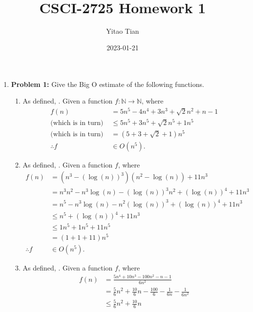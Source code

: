 \documentclass[12pt, a4paper]{article}
\begin{document}
\author{Yitao Tian}
\date{2023-01-21}
\title{CSCI-2725 Homework 1}
\maketitle

\begin{enumerate}
	\item \textbf{Problem 1:} Give the Big O estimate of the following functions. \label{1}
		\begin{enumerate}
		
			\item As defined, . Given a function $f: \mathbb{N} \rightarrow \mathbb{N}$, where
			\begin{align*}
				f(n)                     & = 5n^5 - 4n^4 + 3n^3 + \sqrt{2}n^2 + n - 1 \\
					\textrm{(which is in turn) } & \leq 5n^5 + 3n^5 + \sqrt{2}n^5 + 1n^5 \\
					\textrm{(which is in turn) } & = (5 + 3 + \sqrt{2} + 1) n^5 \\
				\therefore f             & \in O(n^{5}).
			\end{align*} \label{1(a)}
			\item As defined, . Given a function $f$, where
			\begin{align*}
				f(n)         & = (n^3 - (\log(n))^3)(n^2 - \log(n)) + 11n^3 \\
					         & = n^3n^2 - n^3\log(n) - (\log(n))^3n^2 + (\log(n))^4 + 11n^3 \\
					         & = n^5 - n^3\log(n) - n^2(\log(n))^3 + (\log(n))^4 + 11n^3 \\
					         & \leq n^5 + (\log(n))^4 + 11n^3 \\
					         & \leq 1n^5 + 1n^5 + 11n^5 \\
					         & = (1 + 1 + 11) n^5 \\
				\therefore f & \in O(n^5).
			\end{align*} \label{1(b)}
			\item As defined, . Given a function $f$, where
			\begin{align*}
				f(n)         & = \frac{5n^4 + 10n^3 - 100n^2 - n - 1}{6n^2} \\
					         & = \frac{5}{6}n^2 + \frac{10}{6}n - \frac{100}{6} - \frac{1}{6n} - \frac{1}{6n^2} \\
					         & \leq \frac{5}{6}n^2 + \frac{10}{6}n \\

\end{align*}
\end{enumerate}
\end{enumerate}
\end{document}
